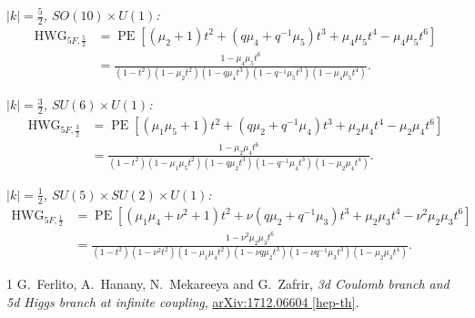 \documentclass[9pt]{article}
\newcommand{\PE}{\operatorname{PE}}
\newcommand{\HWG}{\operatorname{HWG}}
\begin{document}
\emph{$|k|=\frac52$, $SO(10)\times U(1)$:}
\begin{align}
\HWG_{5F,\frac52}
&=\PE\!\left[(\mu_2+1)t^2+(q\mu_4+q^{-1}\mu_5)t^3
+\mu_4\mu_5t^4-\mu_4\mu_5t^6\right]\\
&=\frac{1-\mu_4\mu_5t^6}
{(1-t^2)(1-\mu_2t^2)(1-q\mu_4t^3)(1-q^{-1}\mu_5t^3)(1-\mu_4\mu_5t^4)}.
\end{align}

\emph{$|k|=\frac32$, $SU(6)\times U(1)$:}
\begin{align}
\HWG_{5F,\frac32}
&=\PE\!\left[(\mu_1\mu_5+1)t^2+(q\mu_2+q^{-1}\mu_4)t^3
+\mu_2\mu_4t^4-\mu_2\mu_4t^6\right]\\
&=\frac{1-\mu_2\mu_4t^6}
{(1-t^2)(1-\mu_1\mu_5t^2)(1-q\mu_2t^3)(1-q^{-1}\mu_4t^3)(1-\mu_2\mu_4t^4)}.
\end{align}

\emph{$|k|=\frac12$, $SU(5)\times SU(2)\times U(1)$:}
\begin{align}
\HWG_{5F,\frac12}
&=\PE\!\left[(\mu_1\mu_4+\nu^2+1)t^2
+\nu(q\mu_2+q^{-1}\mu_3)t^3
+\mu_2\mu_3t^4-\nu^2\mu_2\mu_3t^6\right]\\
&=\frac{1-\nu^2\mu_2\mu_3t^6}
{(1-t^2)(1-\nu^2t^2)(1-\mu_1\mu_4t^2)
 (1-\nu q\mu_2t^3)(1-\nu q^{-1}\mu_3t^3)(1-\mu_2\mu_3t^4)}.
\end{align}

\vfill
\begin{thebibliography}{1}\footnotesize
{}
G.~Ferlito, A.~Hanany, N.~Mekareeya and G.~Zafrir,
\emph{3d Coulomb branch and 5d Higgs branch at infinite coupling},
\href{https://arxiv.org/abs/1712.06604}{arXiv:1712.06604 [hep-th]}.
\end{thebibliography}
\end{document}
